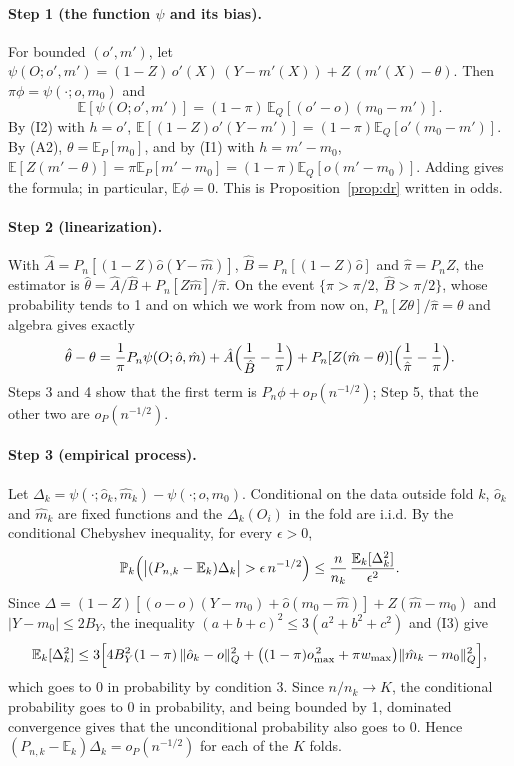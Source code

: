 \documentclass[twoside,11pt]{article}
\newcommand{\E}{\mathbb{E}}
\newcommand{\PP}{\mathbb{P}}
\theoremstyle{plain}
\theoremstyle{definition}
\begin{document}
\paragraph{Step 1 (the function $\psi$ and its bias).} For bounded $(o',m')$, let $\psi(O;o',m')=(1-Z)\,o'(X)\,(Y-m'(X))+Z\,(m'(X)-\theta)$. Then $\pi\phi=\psi(\cdot;o,m_0)$ and
\[
\E[\psi(O;o',m')]=(1-\pi)\,\E_Q[(o'-o)(m_0-m')].
\]
By (I2) with $h=o'$, $\E[(1-Z)o'(Y-m')]=(1-\pi)\E_Q[o'(m_0-m')]$. By (A2), $\theta=\E_P[m_0]$, and by (I1) with $h=m'-m_0$, $\E[Z(m'-\theta)]=\pi\E_P[m'-m_0]=(1-\pi)\E_Q[o(m'-m_0)]$. Adding gives the formula; in particular, $\E\phi=0$. This is Proposition~\ref{prop:dr} written in odds.

\paragraph{Step 2 (linearization).} With $\hat A=P_n[(1-Z)\hat o(Y-\hat m)]$, $\hat B=P_n[(1-Z)\hat o]$ and $\hat\pi=P_nZ$, the estimator is $\hat\theta=\hat A/\hat B+P_n[Z\hat m]/\hat\pi$. On the event $\{\hat\pi>\pi/2,\ \hat B>\pi/2\}$, whose probability tends to 1 and on which we work from now on, $P_n[Z\theta]/\hat\pi=\theta$ and algebra gives exactly
\[
\hat\theta-\theta=\frac1\pi P_n\psi(O;\hat o,\hat m)+\hat A\Bigl(\frac1{\hat B}-\frac1\pi\Bigr)+P_n[Z(\hat m-\theta)]\Bigl(\frac1{\hat\pi}-\frac1\pi\Bigr).
\]
Steps 3 and 4 show that the first term is $P_n\phi+o_P(n^{-1/2})$; Step 5, that the other two are $o_P(n^{-1/2})$.

\paragraph{Step 3 (empirical process).} Let $\Delta_k=\psi(\cdot;\hat o_k,\hat m_k)-\psi(\cdot;o,m_0)$. Conditional on the data outside fold $k$, $\hat o_k$ and $\hat m_k$ are fixed functions and the $\Delta_k(O_i)$ in the fold are i.i.d. By the conditional Chebyshev inequality, for every $\epsilon>0$,
\[
\PP_k\Bigl(\bigl|(P_{n,k}-\E_k)\Delta_k\bigr|>\epsilon\,n^{-1/2}\Bigr)\le\frac{n}{n_k}\,\frac{\E_k[\Delta_k^2]}{\epsilon^2}.
\]
Since $\Delta=(1-Z)[(\hat o-o)(Y-m_0)+\hat o(m_0-\hat m)]+Z(\hat m-m_0)$ and $|Y-m_0|\le2B_Y$, the inequality $(a+b+c)^2\le3(a^2+b^2+c^2)$ and (I3) give
\[
\E_k[\Delta_k^2]\le3\Bigl[4B_Y^2(1-\pi)\,\|\hat o_k-o\|_Q^2+\bigl((1-\pi)o_{\max}^{\,2}+\pi w_{\max}\bigr)\|\hat m_k-m_0\|_Q^2\Bigr],
\]
which goes to 0 in probability by condition 3. Since $n/n_k\to K$, the conditional probability goes to 0 in probability, and being bounded by 1, dominated convergence gives that the unconditional probability also goes to 0. Hence $(P_{n,k}-\E_k)\Delta_k=o_P(n^{-1/2})$ for each of the $K$ folds.
\end{document}
